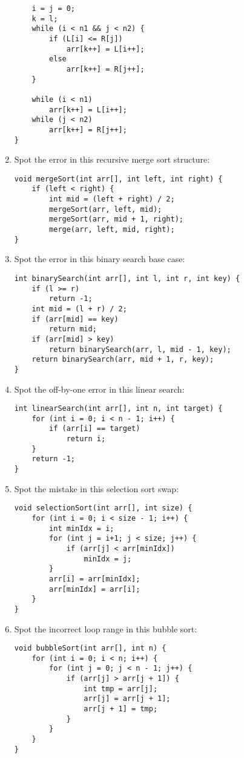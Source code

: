 \documentclass[a4paper,12pt]{article}
\begin{document}
\begin{enumerate}
\begin{lstlisting}
    i = j = 0;
    k = l;
    while (i < n1 && j < n2) {
        if (L[i] <= R[j])
            arr[k++] = L[i++];
        else
            arr[k++] = R[j++];
    }

    while (i < n1)
        arr[k++] = L[i++];
    while (j < n2)
        arr[k++] = R[j++];
}
\end{lstlisting}

    \item Spot the error in this recursive merge sort structure:
\begin{lstlisting}
void mergeSort(int arr[], int left, int right) {
    if (left < right) {
        int mid = (left + right) / 2;
        mergeSort(arr, left, mid);
        mergeSort(arr, mid + 1, right);
        merge(arr, left, mid, right);
}
\end{lstlisting}

    \item Spot the error in this binary search base case:
\begin{lstlisting}
int binarySearch(int arr[], int l, int r, int key) {
    if (l >= r)
        return -1;
    int mid = (l + r) / 2;
    if (arr[mid] == key)
        return mid;
    if (arr[mid] > key)
        return binarySearch(arr, l, mid - 1, key);
    return binarySearch(arr, mid + 1, r, key);
}
\end{lstlisting}

    \item Spot the off-by-one error in this linear search:
\begin{lstlisting}
int linearSearch(int arr[], int n, int target) {
    for (int i = 0; i < n - 1; i++) {
        if (arr[i] == target)
            return i;
    }
    return -1;
}
\end{lstlisting}

\newpage

    \item Spot the mistake in this selection sort swap:
\begin{lstlisting}
void selectionSort(int arr[], int size) {
    for (int i = 0; i < size - 1; i++) {
        int minIdx = i;
        for (int j = i+1; j < size; j++) {
            if (arr[j] < arr[minIdx])
                minIdx = j;
        }
        arr[i] = arr[minIdx];
        arr[minIdx] = arr[i];
    }
}
\end{lstlisting}

    \item Spot the incorrect loop range in this bubble sort:
\begin{lstlisting}
void bubbleSort(int arr[], int n) {
    for (int i = 0; i < n; i++) {
        for (int j = 0; j < n - 1; j++) {
            if (arr[j] > arr[j + 1]) {
                int tmp = arr[j];
                arr[j] = arr[j + 1];
                arr[j + 1] = tmp;
            }
        }
    }
}
\end{lstlisting}

\end{enumerate}
\end{document}
